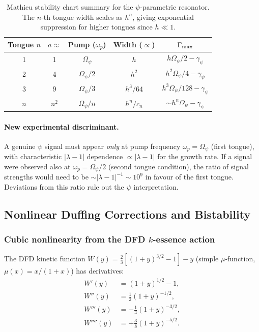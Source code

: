 \documentclass[11pt,twocolumn]{article}
\newcommand{\lam}{\lambda}
\newcommand{\Opsi}{\Omega_\psi}
\newcommand{\gpsi}{\gamma_\psi}
\begin{document}
\begin{table}[h!]
\centering
\begin{tabular}{ccccc}
\toprule
Tongue $n$ & $a \approx$ & Pump ($\omega_p$) & Width ($\propto$) & $\Gamma_{\rm max}$ \\
\midrule
1 & 1 & $\Opsi$ & $h$ & $h\Opsi/2 - \gpsi$ \\
2 & 4 & $\Opsi/2$ & $h^2$ & $h^2\Opsi/4 - \gpsi$ \\
3 & 9 & $\Opsi/3$ & $h^3/64$ & $h^3\Opsi/128 - \gpsi$ \\
$n$ & $n^2$ & $\Opsi/n$ & $h^n/c_n$ & $\sim h^n\Opsi - \gpsi$ \\
\bottomrule
\end{tabular}
\caption{Mathieu stability chart summary for the $\psi$-parametric
resonator. The $n$-th tongue width scales as $h^n$, giving
exponential suppression for higher tongues since $h \ll 1$.}
\label{tab:tongues}
\end{table}

\paragraph{New experimental discriminant.}
A genuine $\psi$ signal must appear \emph{only} at pump frequency
$\omega_p = \Opsi$ (first tongue), with characteristic $|\lam-1|$
dependence $\propto |\lam-1|$ for the growth rate. If a signal
were observed also at $\omega_p = \Opsi/2$ (second tongue condition),
the ratio of signal strengths would need to be $\sim |\lam-1|^{-1}
\sim 10^9$ in favour of the first tongue. Deviations from this ratio
rule out the $\psi$ interpretation.

\subsection{Nonlinear Duffing Corrections and Bistability}
\label{sec:duffing}

\subsubsection{Cubic nonlinearity from the DFD $k$-essence action}

The DFD kinetic function $W(y) = \frac{2}{3}[(1+y)^{3/2}-1] - y$
(simple $\mu$-function, $\mu(x) = x/(1+x)$) has derivatives:
\begin{align}
W'(y) &= (1+y)^{1/2} - 1,\\
W''(y) &= \frac{1}{2}(1+y)^{-1/2},\\
W'''(y) &= -\frac{1}{4}(1+y)^{-3/2},\\
W''''(y) &= +\frac{3}{8}(1+y)^{-5/2}.
\end{align}
\end{document}
